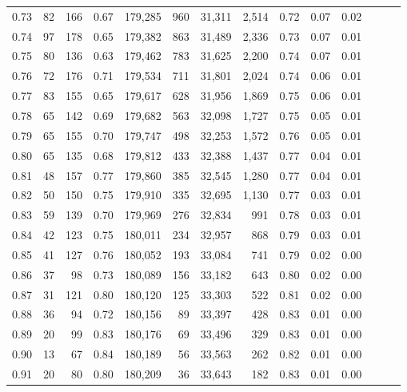 \begin{tabular}{rrrrrrrrrrrrrr}
0.73 &      82 &  166 &  0.67 &  179,285 &      960 &  31,311 &   2,514 &  0.72 &  0.07 &      0.02 \\
0.74 &      97 &  178 &  0.65 &  179,382 &      863 &  31,489 &   2,336 &  0.73 &  0.07 &      0.01 \\
0.75 &      80 &  136 &  0.63 &  179,462 &      783 &  31,625 &   2,200 &  0.74 &  0.07 &      0.01 \\
0.76 &      72 &  176 &  0.71 &  179,534 &      711 &  31,801 &   2,024 &  0.74 &  0.06 &      0.01 \\
0.77 &      83 &  155 &  0.65 &  179,617 &      628 &  31,956 &   1,869 &  0.75 &  0.06 &      0.01 \\
0.78 &      65 &  142 &  0.69 &  179,682 &      563 &  32,098 &   1,727 &  0.75 &  0.05 &      0.01 \\
0.79 &      65 &  155 &  0.70 &  179,747 &      498 &  32,253 &   1,572 &  0.76 &  0.05 &      0.01 \\
0.80 &      65 &  135 &  0.68 &  179,812 &      433 &  32,388 &   1,437 &  0.77 &  0.04 &      0.01 \\
0.81 &      48 &  157 &  0.77 &  179,860 &      385 &  32,545 &   1,280 &  0.77 &  0.04 &      0.01 \\
0.82 &      50 &  150 &  0.75 &  179,910 &      335 &  32,695 &   1,130 &  0.77 &  0.03 &      0.01 \\
0.83 &      59 &  139 &  0.70 &  179,969 &      276 &  32,834 &     991 &  0.78 &  0.03 &      0.01 \\
0.84 &      42 &  123 &  0.75 &  180,011 &      234 &  32,957 &     868 &  0.79 &  0.03 &      0.01 \\
0.85 &      41 &  127 &  0.76 &  180,052 &      193 &  33,084 &     741 &  0.79 &  0.02 &      0.00 \\
0.86 &      37 &   98 &  0.73 &  180,089 &      156 &  33,182 &     643 &  0.80 &  0.02 &      0.00 \\
0.87 &      31 &  121 &  0.80 &  180,120 &      125 &  33,303 &     522 &  0.81 &  0.02 &      0.00 \\
0.88 &      36 &   94 &  0.72 &  180,156 &       89 &  33,397 &     428 &  0.83 &  0.01 &      0.00 \\
0.89 &      20 &   99 &  0.83 &  180,176 &       69 &  33,496 &     329 &  0.83 &  0.01 &      0.00 \\
0.90 &      13 &   67 &  0.84 &  180,189 &       56 &  33,563 &     262 &  0.82 &  0.01 &      0.00 \\
0.91 &      20 &   80 &  0.80 &  180,209 &       36 &  33,643 &     182 &  0.83 &  0.01 &      0.00 \\

\end{tabular}
